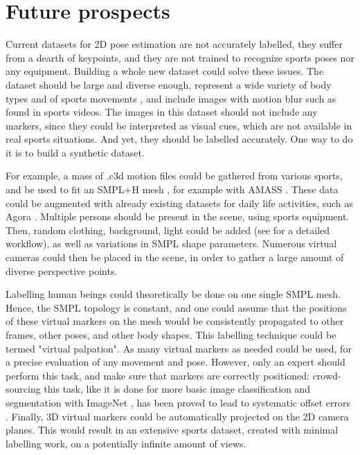 
\section*{Future prospects}
Current datasets for 2D pose estimation are not accurately labelled, they suffer from a dearth of keypoints, and they are not trained to recognize sports poses nor any equipment. Building a whole new dataset could solve these issues. The dataset should be large and diverse enough, represent a wide variety of body types and of sports movements \cite{Seethapathi2019}, and include images with motion blur such as found in sports videos. The images in this dataset should not include any markers, since they could be interpreted as visual cues, which are not available in real sports situations. And yet, they should be labelled accurately. One way to do it is to build a synthetic dataset. 

For example, a mass of .c3d motion files could be gathered from various sports, and be used to fit an SMPL+H mesh \cite{Pavlakos2019}, for example with AMASS \cite{Mahmood2019}. These data could be augmented with already existing datasets for daily life activities, such as Agora \cite{Patel2021}. Multiple persons should be present in the scene, using sports equipment. Then, random clothing, background, light could be added (see \cite{Wood2021,Bolanos2021} for a detailed workflow), as well as variations in SMPL shape parameters. Numerous virtual cameras could then be placed in the scene, in order to gather a large amount of diverse perspective points.

Labelling human beings could theoretically be done on one single SMPL mesh. Hence, the SMPL topology is constant, and one could assume that the positions of these virtual markers on the mesh would be consistently propagated to other frames, other poses, and other body shapes. This labelling technique could be termed "virtual palpation". As many virtual markers as needed could be used, for a precise evaluation of any movement and pose. However, only an expert should perform this task, and make sure that markers are correctly positioned: crowd-sourcing this task, like it is done for more basic image classification and segmentation with ImageNet \cite{Deng2009}, has been proved to lead to systematic offset errors \cite{Needham2021b}. Finally, 3D virtual markers could be automatically projected on the 2D camera planes. This would result in an extensive sports dataset, created with minimal labelling work, on a potentially infinite amount of views. 

